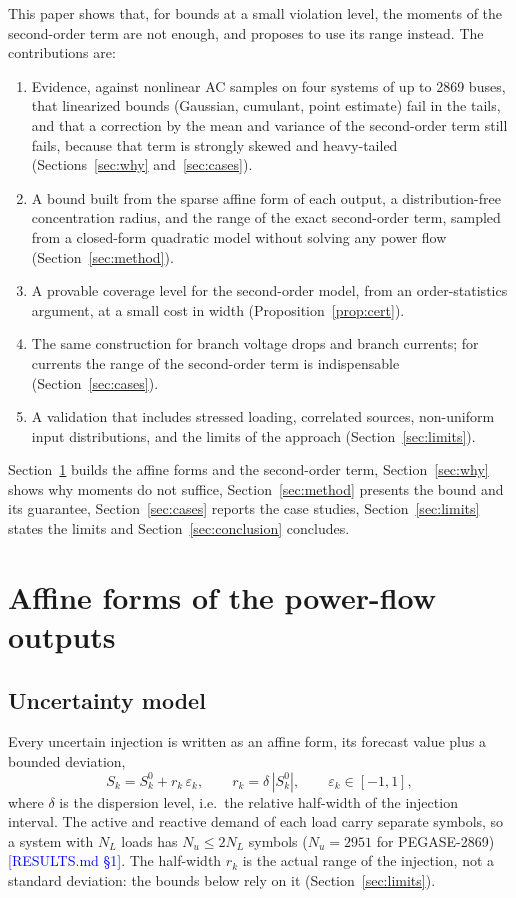 \documentclass[preprint,12pt]{elsarticle}
\newcommand{\src}[1]{\textcolor{blue}{[#1]}}          %
\begin{document}
This paper shows that, for bounds at a small violation level, the moments of the second-order term are not enough,
and proposes to use its range instead. The contributions are:
\begin{enumerate}
\item Evidence, against nonlinear AC samples on four systems of up to 2869 buses, that linearized bounds
(Gaussian, cumulant, point estimate) fail in the tails, and that a correction by the mean and variance of the
second-order term still fails, because that term is strongly skewed and heavy-tailed (Sections~\ref{sec:why}
and~\ref{sec:cases}).
\item A bound built from the sparse affine form of each output, a distribution-free concentration radius, and the
range of the exact second-order term, sampled from a closed-form quadratic model without solving any power flow
(Section~\ref{sec:method}).
\item A provable coverage level for the second-order model, from an order-statistics argument, at a small cost in
width (Proposition~\ref{prop:cert}).
\item The same construction for branch voltage drops and branch currents; for currents the range of the second-order
term is indispensable (Section~\ref{sec:cases}).
\item A validation that includes stressed loading, correlated sources, non-uniform input distributions, and the
limits of the approach (Section~\ref{sec:limits}).
\end{enumerate}

Section~\ref{sec:forms} builds the affine forms and the second-order term, Section~\ref{sec:why} shows why moments
do not suffice, Section~\ref{sec:method} presents the bound and its guarantee, Section~\ref{sec:cases} reports the
case studies, Section~\ref{sec:limits} states the limits and Section~\ref{sec:conclusion} concludes.

\section{Affine forms of the power-flow outputs}\label{sec:forms}

\subsection{Uncertainty model}
Every uncertain injection is written as an affine form, its forecast value plus a bounded deviation,
\begin{equation}\label{eq:injection}
S_k = S_k^0 + r_k\,\varepsilon_k, \qquad r_k = \delta\,|S_k^0|, \qquad \varepsilon_k\in[-1,1],
\end{equation}
where $\delta$ is the dispersion level, i.e.\ the relative half-width of the injection interval. The active and
reactive demand of each load carry separate symbols, so a system with $N_L$ loads has $N_u \le 2N_L$ symbols
($N_u = 2951$ for PEGASE-2869) \src{RESULTS.md §1}. The half-width $r_k$ is the actual range of the injection, not a
standard deviation: the bounds below rely on it (Section~\ref{sec:limits}).
\end{document}
